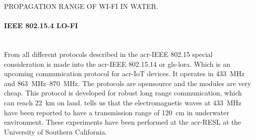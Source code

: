 \begin{RoyalFigure}[!htb, label=fig:propagationrange_wifi]{PROPAGATION RANGE OF WI-FI IN WATER.}
\end{RoyalFigure}

\paragraph{IEEE 802.15.4 LO-FI} \hfill \\
From all different protocols described in the \gls{acr-IEEE} 802.15 special consideration is made into the 
\gls{acr-IEEE} 802.15.14 or \gls{gls-lora}.
Which is an upcoming communication protocol for \gls{acr-IoT} devices. It operates in \SI{433}{\mega\hertz} and 
\SIrange{863}{870}{\mega\hertz}. The protocols are opensource and the modules are very cheap. This protocol is 
developed for robust long range communication, which can reach \SI{22}{\kilo\meter} on land.
\citet{akyildiz_underwater_2005} tells us that the electromagnetic waves at \SI{433}{\mega\hertz} have been reported 
to have a transmission range of \SI{120}{\cm} in underwater environment. These experiments have been performed at the
\gls{acr-RESL} at the University of Southern California.

